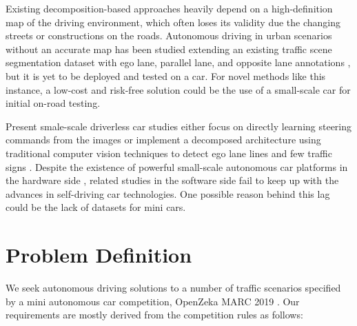 Existing decomposition-based approaches heavily depend on a high-definition map
of the driving environment, which often loses its validity due the changing
streets or constructions on the roads. Autonomous driving in urban scenarios
without an accurate map has been studied extending an existing traffic scene
segmentation dataset with ego lane, parallel lane, and opposite lane
annotations \cite{Meyer2018DeepSL}, but it is yet to be deployed and tested on
a car. For novel methods like this instance, a low-cost and risk-free solution
could be the use of a small-scale car for initial on-road testing.

Present smale-scale driverless car studies either focus on directly learning
steering commands from the images \cite{Bechtel2017DeepPicarAL,
Do2018RealTimeSC} or implement a decomposed architecture using traditional
computer vision techniques to detect ego lane lines and few traffic signs
\cite{Blaga2018MiniatureAV}. Despite the existence of powerful small-scale
autonomous car platforms in the hardware side \cite{Karaman2017ProjectbasedCA},
related studies in the software side fail to keep up with the advances in
self-driving car technologies. One possible reason behind this lag could be the
lack of datasets for mini cars.


\section{Problem Definition}

We seek autonomous driving solutions to a number of traffic scenarios specified
by a mini autonomous car competition, OpenZeka MARC 2019 \cite{OpenZekaMARC}.
Our requirements are mostly derived from the competition rules as follows:

